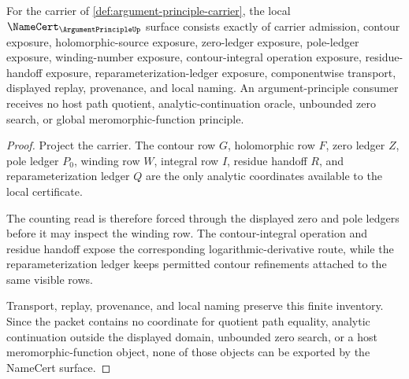 \begin{theorem}
\label{thm:argument-principle-namecert-obligations}
For the carrier of \autoref{def:argument-principle-carrier}, the local $\NameCert_{\ArgumentPrincipleUp}$ surface consists exactly of carrier admission, contour exposure, holomorphic-source exposure, zero-ledger exposure, pole-ledger exposure, winding-number exposure, contour-integral operation exposure, residue-handoff exposure, reparameterization-ledger exposure, componentwise transport, displayed replay, provenance, and local naming. An argument-principle consumer receives no host path quotient, analytic-continuation oracle, unbounded zero search, or global meromorphic-function principle.
\end{theorem}
\begin{proof}
Project the carrier. The contour row $G$, holomorphic row $F$, zero ledger $Z$, pole ledger $P_0$, winding row $W$, integral row $I$, residue handoff $R$, and reparameterization ledger $Q$ are the only analytic coordinates available to the local certificate.

The counting read is therefore forced through the displayed zero and pole ledgers before it may inspect the winding row. The contour-integral operation and residue handoff expose the corresponding logarithmic-derivative route, while the reparameterization ledger keeps permitted contour refinements attached to the same visible rows.

Transport, replay, provenance, and local naming preserve this finite inventory. Since the packet contains no coordinate for quotient path equality, analytic continuation outside the displayed domain, unbounded zero search, or a host meromorphic-function object, none of those objects can be exported by the NameCert surface.
\end{proof}

